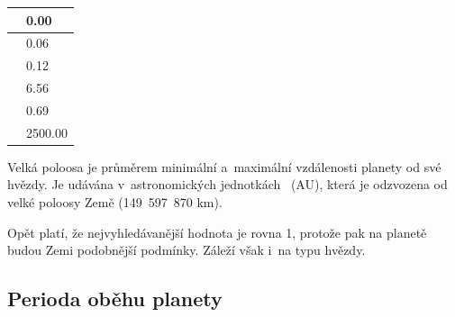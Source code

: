 \documentclass[a4paper,12pt]{article}
\begin{document}
\setlength{\columnsep}{0\textwidth}
\begin{multicols}{2}
\begin{minipage}{0.3\textwidth}
\begin{tabular}{| l| l|}
   \hline
{\cellcolor[rgb]{0.85, 0.85, 0.85}{ Min }} & 0.00 \\ 
   \hline
{\cellcolor[rgb]{0.85, 0.85, 0.85}{ Qu1 }} & 0.06 \\ 
   \hline
{\cellcolor[rgb]{0.85, 0.85, 0.85}{ Median }} & 0.12 \\ 
   \hline
{\cellcolor[rgb]{0.85, 0.85, 0.85}{ Mean }} & 6.56 \\ 
   \hline
{\cellcolor[rgb]{0.85, 0.85, 0.85}{ Qu3 }} & 0.69 \\ 
   \hline
{\cellcolor[rgb]{0.85, 0.85, 0.85}{ Max }} & 2500.00 \\ 
   \hline
\end{tabular}\end{minipage}
\begin{minipage}{0.7\textwidth}
Velká poloosa je průměrem minimální a~maximální vzdálenosti planety od své hvězdy. Je udávána v~astronomických jednotkách ~(AU), která je odzvozena od velké poloosy Země (149~597~870 km).

Opět platí, že nejvyhledávanější hodnota je rovna 1, protože pak na planetě budou Zemi podobnější podmínky. Záleží však i~na typu hvězdy.
\end{minipage}
\end{multicols}

\subsection{Perioda oběhu planety}
\end{document}
